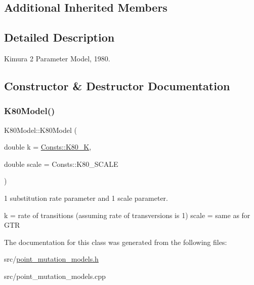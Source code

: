 \subsection*{Additional Inherited Members}


\subsection{Detailed Description}
Kimura 2 Parameter Model, 1980. 

\subsection{Constructor \& Destructor Documentation}
\mbox{\label{classrcombinator_1_1K80Model_af199581e9a4d387f5e9e4f5bd048904b}} 
\subsubsection{\texorpdfstring{K80\+Model()}{K80Model()}}
{\footnotesize\ttfamily K80\+Model\+::\+K80\+Model (\begin{DoxyParamCaption}\item[{double}]{k = {\ttfamily \mbox{\hyperlink{namespacercombinator_1_1Consts_af2e735f6e0661176144a8769131b8aa7}{Consts\+::\+K80\+\_\+K}}},  }\item[{double}]{scale = {\ttfamily Consts\+:\+:K80\+\_\+SCALE} }\end{DoxyParamCaption})}



1 substitution rate parameter and 1 scale parameter. 

k = rate of transitions (assuming rate of transversions is 1) scale = same as for G\+TR 

The documentation for this class was generated from the following files\+:\begin{DoxyCompactItemize}
\item 
src/\mbox{\hyperlink{point__mutation__models_8h}{point\+\_\+mutation\+\_\+models.\+h}}\item 
src/point\+\_\+mutation\+\_\+models.\+cpp\end{DoxyCompactItemize}
